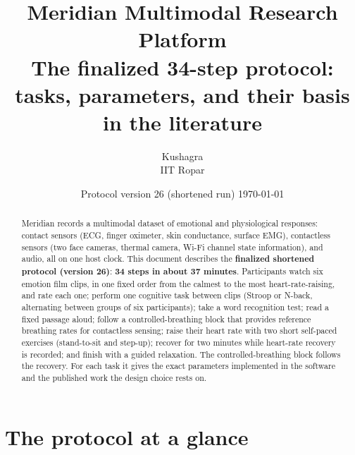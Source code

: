\documentclass[11pt,a4paper]{article}
\title{\color{ink}\textbf{Meridian Multimodal Research Platform}\\[6pt]
  \Large The finalized 34-step protocol: tasks, parameters, and their basis in the literature}
\author{Kushagra \\ IIT Ropar}
\date{Protocol version 26 (shortened run) \quad\textbar\quad \today}
\begin{document}
\maketitle
\thispagestyle{empty}

\begin{abstract}
Meridian records a multimodal dataset of emotional and physiological responses: contact sensors (ECG, finger
oximeter, skin conductance, surface EMG), contactless sensors (two face cameras, thermal camera, Wi-Fi channel state
information), and audio, all on one host clock. This document describes the \textbf{finalized shortened protocol
(version 26)}: \textbf{34 steps in about 37 minutes}. Participants watch six emotion film clips, in one fixed order
from the calmest to the most heart-rate-raising, and rate each one;
perform one cognitive task between clips (Stroop or N-back, alternating between groups of six participants); take a word recognition test; read a fixed passage
aloud; follow a controlled-breathing block that provides reference breathing rates for contactless sensing; raise
their heart rate with two short self-paced exercises (stand-to-sit and step-up); recover for two minutes while
heart-rate recovery is recorded; and finish with a guided relaxation. The controlled-breathing block follows the
recovery. For each task it gives the exact parameters
implemented in the software and the published work the design choice rests on.
\end{abstract}

\tableofcontents
\newpage

\section{The protocol at a glance}

\begin{center}
\end{center}
\end{document}
